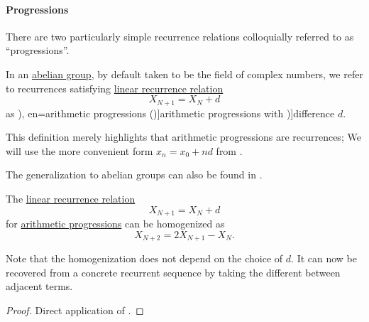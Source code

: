 \paragraph{Progressions}\hfill

There are two particularly simple recurrence relations colloquially referred to as \enquote{progressions}.

\begin{definition}\label{def:arithmetic_progression}\mimprovised
  In an \hyperref[def:abelian_group]{abelian group}, by default taken to be the field of complex numbers, we refer to recurrences satisfying \hyperref[def:linear_recurrence]{linear recurrence relation}
  \begin{equation}\label{eq:def:arithmetic_progression/recurrence}
    X_{N+1} = X_N + d
  \end{equation}
  as \term[ru=арифметические прогрессии (\cite[143]{АлександровМаркушевичХинчинИПр1952ЭнциклопедияТом3}), en=arithmetic progressions (\cite[def. 2.4.3]{Rosen2019DiscreteMathematics})]{arithmetic progressions} with \term[en=common difference (\cite[def. 2.4.3]{Rosen2019DiscreteMathematics})]{difference} \( d \).
\end{definition}
\begin{comments}
  \item This definition merely highlights that arithmetic progressions are recurrences; We will use the more convenient form \( x_n = x_0 + nd \) from .

  \item The generalization to abelian groups can also be found in .
\end{comments}

\begin{proposition}\label{thm:arithmetic_progression_homogeneization}
  The \hyperref[def:linear_recurrence]{linear recurrence relation}
  \begin{equation*}
    X_{N+1} = X_N + d
  \end{equation*}
  for \hyperref[def:arithmetic_progression]{arithmetic progressions} can be homogenized as
  \begin{equation}\label{eq:thm:arithmetic_progression_homogeneization}
    X_{N+2} = 2 X_{N+1} - X_N.
  \end{equation}
\end{proposition}
\begin{comments}
  \item Note that the homogenization does not depend on the choice of \( d \). It can now be recovered from a concrete recurrent sequence by taking the different between adjacent terms.
\end{comments}
\begin{proof}
  Direct application of .
\end{proof}

